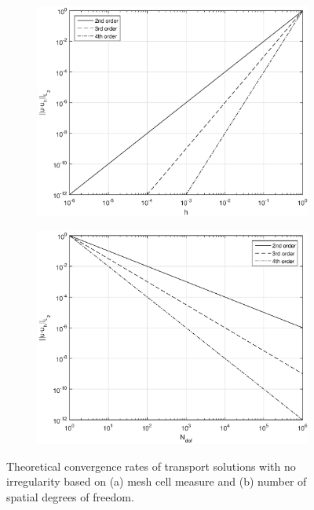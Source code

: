 \documentclass[11pt]{article}
\begin{document}
\begin{figure}[hbt]
\centering
	\begin{subfigure}[b]{0.475\textwidth}
		\centering
		\includegraphics[width=\textwidth]{figures/hconv_larger.eps}
		\caption{}
	\end{subfigure}
	\hfill
	\begin{subfigure}[b]{0.475\textwidth}
		\centering
		\includegraphics[width=\textwidth]{figures/Nconv_larger.eps}
		\caption{}
	\end{subfigure}
\caption{Theoretical convergence rates of transport solutions with no irregularity based on (a) mesh cell measure and (b) number of spatial degrees of freedom.}
\label{fig::conv_rates}
\end{figure}
\end{document}
